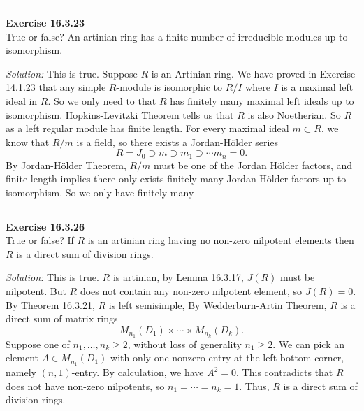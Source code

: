 \documentclass[a4paper, 12pt]{article}
\newenvironment{problem}[2][Exercise]
    { \begin{mdframed}[backgroundcolor=gray!20] \textbf{#1 #2} \\}
    {  \end{mdframed}}
\newenvironment{solution}
    {\textit{Solution:}}
    {}
\begin{document}
\noindent\rule{7in}{2.8pt}
\begin{problem}{16.3.23}
True or false? An artinian ring has a finite number of irreducible modules up to isomorphism.
\end{problem}
\begin{solution}
This is true. Suppose \(R\) is an Artinian ring. We have proved in Exercise 14.1.23 that any simple \(R\)-module is isomorphic to \(R/I\) where \(I\) is a maximal left ideal in \(R\). So we only need to that 
\(R\) has finitely many maximal left ideals up to isomorphism. Hopkins-Levitzki Theorem tells us that \(R\) is also Noetherian. So \(R\) as a left regular module has finite length. 
For every maximal ideal \(m\subset R\), we know that \(R/m\) is a field, so there exists a Jordan-H\"{o}lder series 
\[R=J_0\supset m\supset m_1\supset \cdots m_n=0.\]
By Jordan-H\"{o}lder Theorem, \(R/m\) must be one of the Jordan H\"{o}lder factors, and finite length implies there only exists finitely many Jordan-H\"{o}lder factors up to isomorphism. So we only have finitely many

\end{solution}

\noindent\rule{7in}{2.8pt}
\begin{problem}{16.3.26}
True or false? If \(R\) is an artinian ring having no non-zero nilpotent elements then \(R\) is a direct sum of division rings.
\end{problem}
\begin{solution}
This is true. \(R\) is artinian, by Lemma 16.3.17, \(J(R)\) must be nilpotent. But \(R\) does not contain any non-zero nilpotent element, so \(J(R)=0\). By Theorem 16.3.21, \(R\) is left semisimple, By Wedderburn-Artin Theorem, 
\(R\) is a direct sum of matrix rings 
\[M_{n_1}(D_1)\times \cdots \times M_{n_k}(D_k).\]
Suppose one of \(n_1,\ldots,n_k\geq 2\), without loss of generality \(n_1\geq 2\). We can pick an element \(A\in M_{n_1}(D_1)\) with only one nonzero entry at the left bottom corner, namely \((n,1)\)-entry. By calculation, we have \(A^2=0\). This contradicts that 
\(R\) does not have non-zero nilpotents, so \(n_1=\cdots=n_k=1\). Thus, \(R\) is a direct sum of division rings. 
\end{solution}
\end{document}
